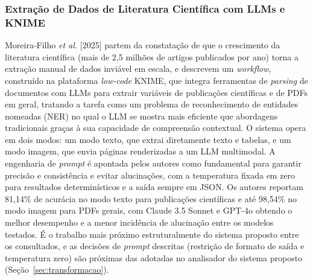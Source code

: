 \documentclass[12pt]{article}
\begin{document}
  \subsubsection{Extração de Dados de Literatura Científica com LLMs e KNIME}
  Moreira-Filho \emph{et al.} [2025] partem da constatação de que o crescimento da literatura científica (mais de 2,5 milhões de artigos publicados por ano) torna a extração manual de dados inviável em escala, e descrevem um \emph{workflow}, construído na plataforma \emph{low-code} KNIME, que integra ferramentas de \emph{parsing} de documentos com LLMs para extrair variáveis de publicações científicas e de PDFs em geral, tratando a tarefa como um problema de reconhecimento de entidades nomeadas (NER) no qual o LLM se mostra mais eficiente que abordagens tradicionais graças à sua capacidade de compreensão contextual. O sistema opera em dois modos: um modo texto, que extrai diretamente texto e tabelas, e um modo imagem, que envia páginas renderizadas a um LLM multimodal. A engenharia de \emph{prompt} é apontada pelos autores como fundamental para garantir precisão e consistência e evitar alucinações, com a temperatura fixada em zero para resultados determinísticos e a saída sempre em JSON. Os autores reportam 81,14\% de acurácia no modo texto para publicações científicas e até 98,54\% no modo imagem para PDFs gerais, com Claude 3.5 Sonnet e GPT-4o obtendo o melhor desempenho e a menor incidência de alucinação entre os modelos testados. É o trabalho mais próximo estruturalmente do sistema proposto entre os consultados, e as decisões de \emph{prompt} descritas (restrição de formato de saída e temperatura zero) são próximas das adotadas no analisador do sistema proposto (Seção~\ref{sec:transformacao}).
\end{document}
